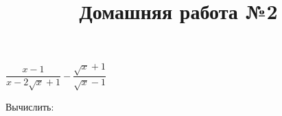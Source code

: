 \begin{listofex}
\begin{enumcols}[itemcolumns=3]
		\item \( \dfrac{x-1}{x-2\sqrt{x}+1}-\dfrac{\sqrt{x}+1}{\sqrt{x}-1} \) 
	\end{enumcols}
	\item Вычислить:
	\begin{enumcols}[itemcolumns=2]
		\item {}
		\item {}
	\end{enumcols}
\end{listofex}
\newpage
\title{Домашняя работа №2}
